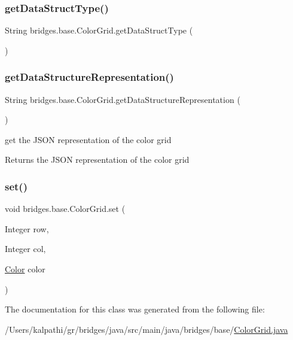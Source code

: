 \subsubsection{\texorpdfstring{getDataStructType()}{getDataStructType()}}
{\footnotesize\ttfamily String bridges.\+base.\+Color\+Grid.\+get\+Data\+Struct\+Type (\begin{DoxyParamCaption}{ }\end{DoxyParamCaption})}

\mbox{\label{classbridges_1_1base_1_1_color_grid_a81ca0995d17b6cb31122b718dfa57286}} 
\subsubsection{\texorpdfstring{getDataStructureRepresentation()}{getDataStructureRepresentation()}}
{\footnotesize\ttfamily String bridges.\+base.\+Color\+Grid.\+get\+Data\+Structure\+Representation (\begin{DoxyParamCaption}{ }\end{DoxyParamCaption})}

get the J\+S\+ON representation of the color grid

\begin{DoxyReturn}{Returns}
the J\+S\+ON representation of the color grid 
\end{DoxyReturn}
\mbox{\label{classbridges_1_1base_1_1_color_grid_a93b29af9bb21b2bf6e52bc3fda9ff34a}} 
\subsubsection{\texorpdfstring{set()}{set()}}
{\footnotesize\ttfamily void bridges.\+base.\+Color\+Grid.\+set (\begin{DoxyParamCaption}\item[{Integer}]{row,  }\item[{Integer}]{col,  }\item[{\mbox{\hyperlink{classbridges_1_1base_1_1_color}{Color}}}]{color }\end{DoxyParamCaption})}



The documentation for this class was generated from the following file\+:\begin{DoxyCompactItemize}
\item 
/\+Users/kalpathi/gr/bridges/java/src/main/java/bridges/base/\mbox{\hyperlink{_color_grid_8java}{Color\+Grid.\+java}}\end{DoxyCompactItemize}
